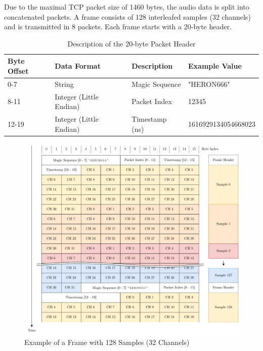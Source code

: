 Due to the maximal TCP packet size of 1460 bytes, the audio data is split into concatenated packets.
A frame consists of 128 interleafed samples (32 channels) and is transmitted in 8 packets.
Each frame starts with a 20-byte header.

\begin{table}[h]
	\centering
	\begin{tabular}{|l|l|l|l|}
		\hline
		\textbf{Byte Offset} & \textbf{Data Format}    & \textbf{Description} & \textbf{Example Value} \\ \hline
		0-7                  & String                  & Magic Sequence       & "HERON666"             \\ \hline
		8-11                 & Integer (Little Endian) & Packet Index         & 12345                  \\ \hline
		12-19                & Integer (Little Endian) & Timestamp (ns)       & 1616929134054668023    \\ \hline
	\end{tabular}
	\caption{Description of the 20-byte Packet Header}
	\label{tab:packet_header}
\end{table}

\begin{figure}[h]
	\centering
	\includegraphics[width=1.0\textwidth]{images/6_design_final/Audio_Stream_Frame.pdf}
	\caption{Example of a Frame with 128 Samples (32 Channels)}
	\label{fig:frame_example}
\end{figure}

